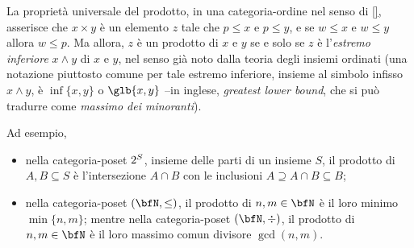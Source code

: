 \begin{example}\label{ex_prodotti_in_catcomepos}
 La proprietà universale del prodotto, in una categoria-ordine nel senso di \ref{}, asserisce che \(x\times y\) è un elemento \(z\) tale che \(p\le x\) e \(p\le y\), e se \(w\le x\) e \(w\le y\) allora \(w\le p\). Ma allora, \(z\) è un prodotto di \(x\) e \(y\) se e solo se \(z\) è l'\emph{estremo inferiore} \(x\land y\) di \(x\) e \(y\), nel senso già noto dalla teoria degli insiemi ordinati (una notazione piuttosto comune per tale estremo inferiore, insieme al simbolo infisso \(x\land y\), è \(\inf\{x,y\}\) o \(\glb\{x,y\}\) --in inglese, \emph{greatest lower bound}, che si può tradurre come \emph{massimo dei minoranti}).

 Ad esempio,
 \begin{itemize}
  \item nella categoria-poset \(2^{S}\), insieme delle parti di un insieme \(S\), il prodotto di \(A,B\subseteq S\) è l'intersezione \(A\cap B\) con le inclusioni \(A\supseteq A\cap B\subseteq B\);
  \item nella categoria-poset \((\bfN,\le)\), il prodotto di \(n,m\in\bfN\) è il loro minimo \(\min\{n,m\}\); mentre nella categoria-poset \((\bfN,\div)\), il prodotto di \(n,m\in\bfN\) è il loro massimo comun divisore \(\gcd(n,m)\).
 \end{itemize}
\end{example}
\begin{example}\label{ex_prodotti_in_moncomepos}
 \Todo{}
\end{example}
\begin{example}\label{ex_cats_senza_prodotti}
 \Todo{}
\end{example}
\Todo{}
